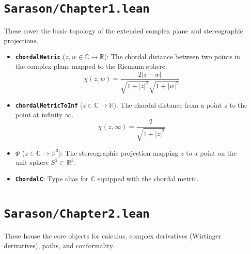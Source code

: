 \documentclass[11pt]{article}
\begin{document}
\section{\texttt{Sarason/Chapter1.lean}}

These cover the basic topology of the extended complex plane and stereographic projections.

\begin{itemize}
    \item \textbf{\texttt{chordalMetric}} ($z, w \in \mathbb{C} \to \mathbb{R}$): The chordal distance between two points in the complex plane mapped to the Riemann sphere.
    \[ \chi(z, w) = \frac{2|z - w|}{\sqrt{1 + |z|^2} \sqrt{1 + |w|^2}} \]
    
    \item \textbf{\texttt{chordalMetricToInf}} ($z \in \mathbb{C} \to \mathbb{R}$): The chordal distance from a point $z$ to the point at infinity $\infty$.
    \[ \chi(z, \infty) = \frac{2}{\sqrt{1 + |z|^2}} \]
    
    \item \textbf{\texttt{$\Phi$}} ($z \in \mathbb{C} \to \mathbb{R}^3$): The stereographic projection mapping $z$ to a point on the unit sphere $S^2 \subset \mathbb{R}^3$.
    
    \item \textbf{\texttt{ChordalC}}: Type alias for $\mathbb{C}$ equipped with the chordal metric.
\end{itemize}

\section{\texttt{Sarason/Chapter2.lean}}

These house the core objects for calculus, complex derivatives (Wirtinger derivatives), paths, and conformality.
\end{document}
